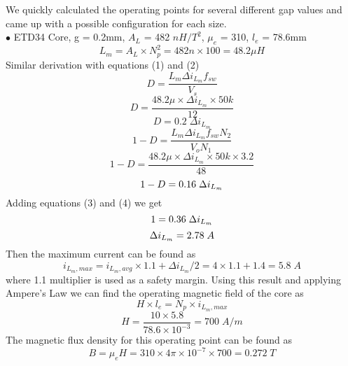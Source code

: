We quickly calculated the operating points for several different gap values and came up with a possible configuration for each size. \medskip \\
$\bullet$ ETD34 Core, g = 0.2mm, $A_L$ = 482 $nH/T^2$, $\mu_e$ = 310, $l_e$ = 78.6mm
\begin{equation*}
    L_m = A_L \times N_p^2 = 482n \times 100 = 48.2 \mu H
\end{equation*}
Similar derivation with equations (1) and (2)
\begin{equation*}
    D = \frac{L_m \Delta i_{L_m} f_{sw}}{V_s}
\end{equation*}
\begin{equation*}
    D = \frac{48.2\mu \times \Delta i_{L_m} \times 50k}{12}
\end{equation*}
\begin{equation}
    D = 0.2 \; \Delta i_{L_m}
\end{equation}
\begin{equation*}
    1-D = \frac{L_m \Delta i_{L_m} f_{sw} N_2}{V_o N_1}
\end{equation*}
\begin{equation*}
    1-D = \frac{48.2\mu \times \Delta i_{L_m} \times 50k \times 3.2}{48}
\end{equation*}
\begin{equation}  \\
    1-D = 0.16 \; \Delta i_{L_m}
\end{equation}
Adding equations (3) and (4) we get
\begin{equation*}  \\
    1 = 0.36 \; \Delta i_{L_m}
\end{equation*}
\begin{equation*}  \\
    \Delta i_{L_m} = 2.78 \; A
\end{equation*}
Then the maximum current can be found as
\begin{equation*}
    i_{L_m,max} = i_{L_m,avg} \times 1.1 + \Delta i_{L_m}/2 = 4 \times 1.1 + 1.4 = 5.8 \; A
\end{equation*}
where 1.1 multiplier is used as a safety margin. Using this result and applying Ampere's Law we can find the operating magnetic field of the core as
\begin{equation*}
    H \times l_e = N_p \times i_{L_m,max}
\end{equation*}
\begin{equation*}
    H = \frac{10 \times 5.8}{78.6 \times 10^{-3}} = 700 \; A/m
\end{equation*}
The magnetic flux density for this operating point can be found as
\begin{equation*}
    B = \mu_e H = 310 \times 4\pi \times 10^{-7} \times 700 = 0.272 \; T
\end{equation*}


